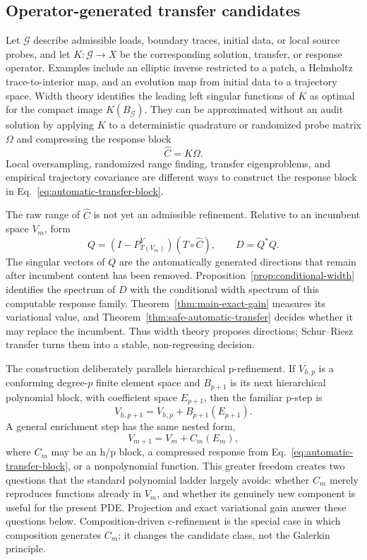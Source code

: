\documentclass[11pt]{article}
\numberwithin{algorithm}{section}
\theoremstyle{definition}\newtheorem{definition}[theorem]{Definition}
\theoremstyle{remark}\newtheorem{remark}[theorem]{Remark}
\begin{document}
\subsection{Operator-generated transfer candidates}
Let $\mathcal G$ describe admissible loads, boundary traces, initial data, or
local source probes, and let $K:\mathcal G\to X$ be the corresponding
solution, transfer, or response operator.  Examples include an elliptic inverse
restricted to a patch, a Helmholtz trace-to-interior map, and an evolution map
from initial data to a trajectory space.  Width theory identifies the leading
left singular functions of $K$ as optimal for the compact image
$K(B_{\mathcal G})$.  They can be approximated without an audit solution by
applying $K$ to a deterministic quadrature or randomized probe matrix $\Omega$
and compressing the response block
\begin{equation}
 \widehat C=K\Omega.
 \label{eq:automatic-transfer-block}
\end{equation}
Local oversampling, randomized range finding, transfer eigenproblems, and
empirical trajectory covariance are different ways to construct the response
block in Eq.~\eqref{eq:automatic-transfer-block}.

The raw range of $\widehat C$ is not yet an admissible refinement.  Relative to
an incumbent space $V_m$, form
\[
 Q=(I-P_{T(V_m)}^Y)(T\circ\widehat C),\qquad D=Q^*Q.
\]
The singular vectors of $Q$ are the automatically generated directions that
remain after incumbent content has been removed.  Proposition~\ref{prop:conditional-width}
identifies the spectrum of $D$ with the conditional width spectrum of this
computable response family.  Theorem~\ref{thm:main-exact-gain} measures its
variational value, and Theorem~\ref{thm:safe-automatic-transfer} decides
whether it may replace the incumbent.  Thus width theory proposes directions;
Schur--Riesz transfer turns them into a stable, non-regressing decision.

The construction deliberately parallels hierarchical p-refinement.  If
$V_{h,p}$ is a conforming degree-$p$ finite element space and $B_{p+1}$ is its
next hierarchical polynomial block, with coefficient space $E_{p+1}$, then
the familiar p-step is
\begin{equation}
 V_{h,p+1}=V_{h,p}+B_{p+1}(E_{p+1}).
 \label{eq:p-step-analogy}
\end{equation}
A general enrichment step has the same nested form,
\begin{equation}
 V_{m+1}=V_m+C_m(E_m),
 \label{eq:c-step-analogy}
\end{equation}
where $C_m$ may be an h/p block, a compressed response from
Eq.~\eqref{eq:automatic-transfer-block}, or a nonpolynomial function.  This
greater freedom creates two questions that the standard polynomial ladder
largely avoids: whether $C_m$ merely reproduces functions already in $V_m$,
and whether its genuinely new component is useful for the present PDE.
Projection and exact variational gain answer these questions below.
Composition-driven c-refinement is the special case in which composition
generates $C_m$; it changes the candidate class, not the Galerkin principle.
\end{document}
